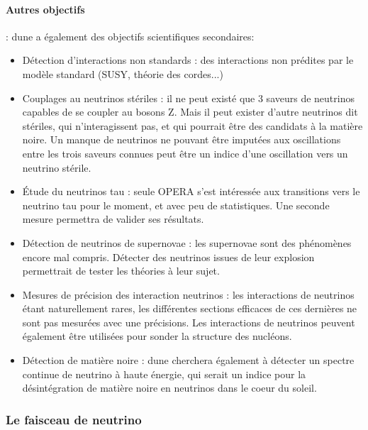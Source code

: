 	         \paragraph{Autres objectifs} :
	          \gls{dune} a également des objectifs scientifiques secondaires:
	          \begin{itemize}
	              \item Détection d'interactions non standards : des interactions non prédites par le modèle standard (SUSY, théorie des cordes...)
	              \item Couplages au neutrinos stériles : il ne peut existé que 3 saveurs de neutrinos capables de se coupler au bosons Z\cite{Olive2016}. Mais il peut exister d'autre neutrinos dit stériles, qui n'interagissent pas, et qui pourrait être des candidats à la matière noire. Un manque de neutrinos ne pouvant être imputées aux oscillations entre les trois saveurs connues peut être un indice d'une oscillation vers un neutrino stérile.
	              \item Étude du neutrinos tau : seule OPERA s'est intéressée aux transitions vers le neutrino tau pour le moment, et avec peu de statistiques. Une seconde mesure permettra de valider ses résultats.
	              \item Détection de neutrinos de supernovae : les supernovae sont des phénomènes encore mal compris. Détecter des neutrinos issues de leur explosion permettrait de tester les théories à leur sujet.
	              \item Mesures de précision des interaction neutrinos : les interactions de neutrinos étant naturellement rares, les différentes sections efficaces de ces dernières ne sont pas mesurées avec une précisions. Les interactions de neutrinos peuvent également être utilisées pour sonder la structure des nucléons.
	              \item Détection de matière noire : \gls{dune} cherchera également à détecter un spectre continue de neutrino à haute énergie, qui serait un indice pour la désintégration de matière noire en neutrinos dans le coeur du soleil\cite{Rott2017}. 
	          \end{itemize}
	        
	         \subsubsection{Le faisceau de neutrino}\label{sec::faisceau}
	        

